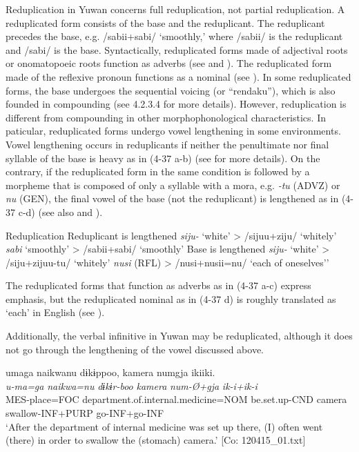 Reduplication in Yuwan concerns full reduplication, not partial reduplication. A reduplicated form consists of the base and the reduplicant. The reduplicant precedes the base, e.g. /sabii+sabi/ ‘smoothly,’ where /sabii/ is the reduplicant and /sabi/ is the base. Syntactically, reduplicated forms made of adjectival roots or onomatopoeic roots function as adverbs (see  and ). The reduplicated form made of the reflexive pronoun functions as a nominal (see ). In some reduplicated forms, the base undergoes the sequential voicing (or “rendaku”), which is also founded in compounding (see 4.2.3.4 for more details). However, reduplication is different from compounding in other morphophonological characteristics. In paticular, reduplicated forms undergo vowel lengthening in some environments. Vowel lengthening occurs in reduplicants if neither the penultimate nor final syllable of the base is heavy as in (4-37 a-b) (see  for more details). On the contrary, if the reduplicated form in the same condition is followed by a morpheme that is composed of only a syllable with a mora, e.g. \textit{{}-tu} (ADVZ) or \textit{nu} (GEN), the final vowel of the base (not the reduplicant) is lengthened as in (4-37 c-d) (see also  and ). 

\ea  Reduplication \label{ex:4.37}
 Reduplicant is lengthened
  \ea  \textit{siju-}  ‘white’  >  /sijuu+ziju/  ‘whitely’
  \ex  \textit{sabi}  ‘smoothly’  >  /sabii+sabi/  ‘smoothly’
 Base is lengthened
  \ex  \textit{siju-}  ‘white’  >  /siju+zijuu{}-tu/  ‘whitely’
  \ex  \textit{nusi}  (RFL)  >  /nusi+nusii=nu/  ‘each of oneselves’’
  \z
\z

The reduplicated forms that function as adverbs as in (4-37 a-c) express emphasis, but the reduplicated nominal as in (4-37 d) is roughly translated as ‘each’ in English (see ).

  Additionally, the verbal infinitive in Yuwan may be reduplicated, although it does not go through the lengthening of the vowel discussed above.

\ea  \label{ex:4.38}
\ea %
\glll    umaga  naikwanu  dɨkɨppoo,   {\textbar}kamera{\textbar}  numgja  ikiiki.\\
      \textit{u-ma=ga}  \textit{naikwa=nu}  \textit{dɨkɨr-boo}    \textit{kamera}  \textit{num-Ø+gja}  \textit{ik-i+ik-i}\\
      MES-place=FOC  department.of.internal.medicine=NOM  be.set.up-CND  camera  swallow-INF+PURP  go-INF+go-INF      \\
      \glt       ‘After the department of internal medicine was set up there, (I) often went (there) in order to swallow the (stomach) camera.’ [Co: 120415\_01.txt]

